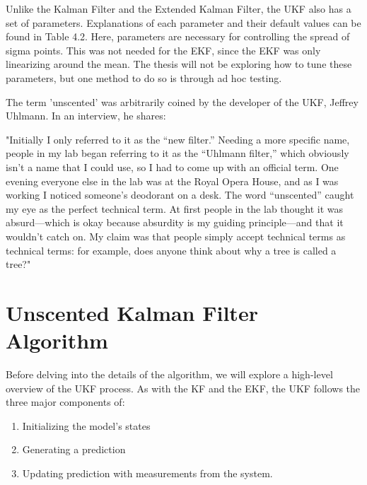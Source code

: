 \newpage

\noindent Unlike the Kalman Filter and the Extended Kalman Filter, the UKF also has a set of parameters. Explanations of each parameter and their default values can be found in Table 4.2. Here, parameters are necessary for controlling the spread of sigma points. This was not needed for the EKF, since the EKF was only linearizing around the mean. The thesis will not be exploring how to tune these parameters, but one method to do so is through ad hoc testing.


\noindent The term 'unscented' was arbitrarily coined by the developer of the UKF, Jeffrey Uhlmann. In an interview, he shares:
\begin{displayquote}
"Initially I only referred to it as the “new filter.” Needing a more specific name, people in my lab began referring to it as the “Uhlmann filter,” which obviously isn’t a name that I could use, so I had to come up with an official term. One evening everyone else in the lab was at the Royal Opera House, and as I was working I noticed someone’s deodorant on a desk. The word “unscented” caught my eye as the perfect technical term. At first people in the lab thought it was absurd—which is okay because absurdity is my guiding principle—and that it wouldn’t catch on. My claim was that people simply accept technical terms as technical terms: for example, does anyone think about why a tree is called a tree?"
\end{displayquote}


\newpage

\section{Unscented Kalman Filter Algorithm}

\noindent Before delving into the details of the algorithm, we will explore a high-level overview of the UKF process. As with the KF and the EKF, the UKF follows the three major components of:
\begin{enumerate}
  \item Initializing the model's states
  \item Generating a prediction
  \item Updating prediction with measurements from the system.
\end{enumerate}

